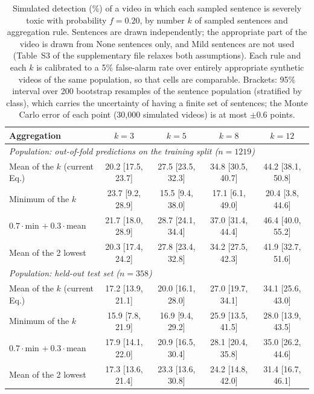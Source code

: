 \begin{table}[!t]
\centering
\caption{Simulated detection (\%) of a video in which each sampled sentence is severely toxic with probability $f = 0.20$, by number $k$ of sampled sentences and aggregation rule. Sentences are drawn independently; the appropriate part of the video is drawn from None sentences only, and Mild sentences are not used (Table~S3 of the supplementary file relaxes both assumptions). Each rule and each $k$ is calibrated to a 5\% false-alarm rate over entirely appropriate synthetic videos of the same population, so that cells are comparable. Brackets: 95\% interval over 200 bootstrap resamples of the sentence population (stratified by class), which carries the uncertainty of having a finite set of sentences; the Monte Carlo error of each point (30,000 simulated videos) is at most $\pm$0.6 points.}
\label{tab:simulacao}
\begin{tabular}{lcccc}
\toprule
Aggregation & $k=3$ & $k=5$ & $k=8$ & $k=12$ \\
\midrule
\multicolumn{5}{l}{\emph{Population: out-of-fold predictions on the training split ($n = 1219$)}} \\
Mean of the $k$ (current Eq.) & 20.2 [17.5, 23.7] & 27.5 [23.5, 32.3] & 34.8 [30.5, 40.7] & 44.2 [38.1, 50.8] \\
Minimum of the $k$ & 23.7 [9.2, 28.9] & 15.5 [9.4, 38.0] & 17.1 [6.1, 49.0] & 20.4 [3.8, 44.6] \\
$0.7\cdot$min $+\ 0.3\cdot$mean & 21.7 [18.0, 28.9] & 28.7 [24.1, 34.4] & 37.0 [31.4, 44.4] & 46.4 [40.0, 55.2] \\
Mean of the 2 lowest & 20.3 [17.4, 24.2] & 27.8 [23.4, 32.8] & 34.2 [27.5, 42.3] & 41.9 [32.7, 51.6] \\
\midrule
\multicolumn{5}{l}{\emph{Population: held-out test set ($n = 358$)}} \\
Mean of the $k$ (current Eq.) & 17.2 [13.9, 21.1] & 20.0 [16.1, 28.0] & 27.0 [19.7, 34.1] & 34.1 [25.6, 43.0] \\
Minimum of the $k$ & 15.9 [7.8, 21.9] & 16.9 [9.4, 29.2] & 25.9 [13.5, 41.5] & 28.0 [13.9, 43.5] \\
$0.7\cdot$min $+\ 0.3\cdot$mean & 17.9 [14.1, 22.0] & 20.9 [16.5, 30.4] & 28.1 [20.4, 35.8] & 35.0 [26.2, 44.6] \\
Mean of the 2 lowest & 17.3 [13.6, 21.4] & 23.3 [13.6, 30.8] & 24.2 [14.8, 42.0] & 31.4 [16.7, 46.1] \\
\bottomrule
\end{tabular}
\end{table}

